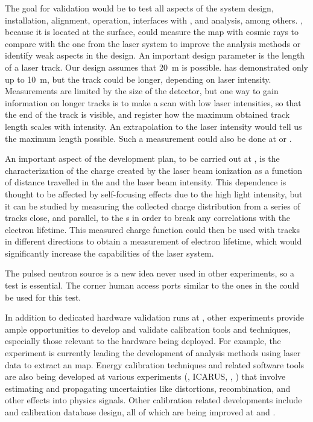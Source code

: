 The goal for validation would be to test all aspects of the system design, installation, alignment, operation, interfaces with , and analysis, among others. , because it is located at the surface, could measure the \efield map with cosmic rays to compare with the one from the laser system to improve the analysis methods or identify weak aspects in the design. An important design parameter is the length of a laser track. Our design assumes that \SI{20}{\m} is possible.  has demonstrated only up to \SI{10}{\m}, but the track could be longer, depending on laser intensity. Measurements are limited by the size of the detector, but one way to gain information on longer tracks is to make a scan with low laser intensities, so that the end of the track is  visible, and register how the maximum obtained track length scales with intensity. An extrapolation to the   laser intensity would tell us the maximum length possible. Such a measurement could also be done at  or .

An important aspect of the development plan, to be carried out at , is the characterization of the charge created by the laser beam ionization as a function of distance travelled in the  and the laser beam intensity. This dependence is thought to be affected by self-focusing effects due to the high light intensity, but it can be studied by measuring the collected charge distribution from a series of tracks close, and parallel, to the s in order to break any correlations with the electron lifetime. This measured charge function could then be used with tracks in different directions to obtain a measurement of electron lifetime, which would significantly increase the capabilities of the laser system. 

The pulsed neutron source is a new idea never used in other experiments, so a  test is essential. The corner human access ports similar to the ones in the   could be used for this test.


In addition to dedicated hardware validation runs at , other  experiments provide ample opportunities to develop and validate calibration tools and techniques, especially those relevant to the hardware being deployed. For example, the  experiment is currently leading the development of analysis methods using laser data to extract an \efield map. Energy calibration techniques and related software tools are also being developed at various experiments (, ICARUS, , ) that involve estimating and propagating uncertainties like \efield distortions, recombination, and other effects into physics signals. Other calibration related developments include  and calibration database design, all of which are being improved at  and .
 

